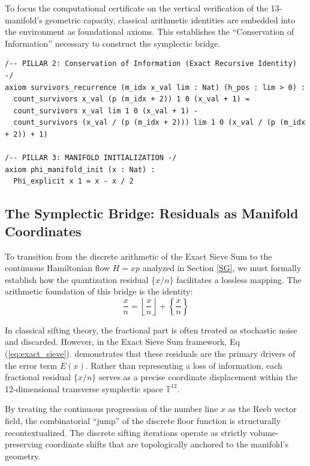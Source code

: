 \documentclass[sn-mathphys-num, pdflatex]{sn-jnl}
\begin{document}
To focus the computational certificate on the vertical verification of the 13-manifold's geometric capacity, classical arithmetic identities are embedded into the environment as foundational axioms. This establishes the ``Conservation of Information'' necessary to construct the symplectic bridge.

\begin{verbatim}
/-- PILLAR 2: Conservation of Information (Exact Recursive Identity) -/
axiom survivors_recurrence (m_idx x_val lim : Nat) (h_pos : lim > 0) :
  count_survivors x_val (p (m_idx + 2)) 1 0 (x_val + 1) =
  count_survivors x_val lim 1 0 (x_val + 1) -
  count_survivors (x_val / (p (m_idx + 2))) lim 1 0 (x_val / (p (m_idx + 2)) + 1)

/-- PILLAR 3: MANIFOLD INITIALIZATION -/
axiom phi_manifold_init (x : Nat) :
  Phi_explicit x 1 = x - x / 2
\end{verbatim}

\subsection{The Symplectic Bridge: Residuals as Manifold Coordinates}

To transition from the discrete arithmetic of the Exact Sieve Sum to the continuous Hamiltonian flow $H=xp$ analyzed in Section \ref{SG}, we must formally establish how the quantization residual $\{x/n\}$ facilitates a lossless mapping. The arithmetic foundation of this bridge is the identity:
\begin{equation}
\frac{x}{n} = \left\lfloor \frac{x}{n} \right\rfloor + \left\{\frac{x}{n}\right\}
\end{equation}

In classical sifting theory, the fractional part is often treated as stochastic noise and discarded. However, in the Exact Sieve Sum framework, Eq (\ref{eq:exact_sieve}). demonstrates that these residuals are the primary drivers of the error term $E(x)$. Rather than representing a loss of information, each fractional residual $\{x/n\}$ serves as a precise coordinate displacement within the 12-dimensional transverse symplectic space $\mathbb{T}^{12}$.

By treating the continuous progression of the number line $x$ as the Reeb vector field, the combinatorial ``jump'' of the discrete floor function is structurally recontextualized. The discrete sifting iterations operate as strictly volume-preserving coordinate shifts that are topologically anchored to the manifold's geometry. 
\end{document}
